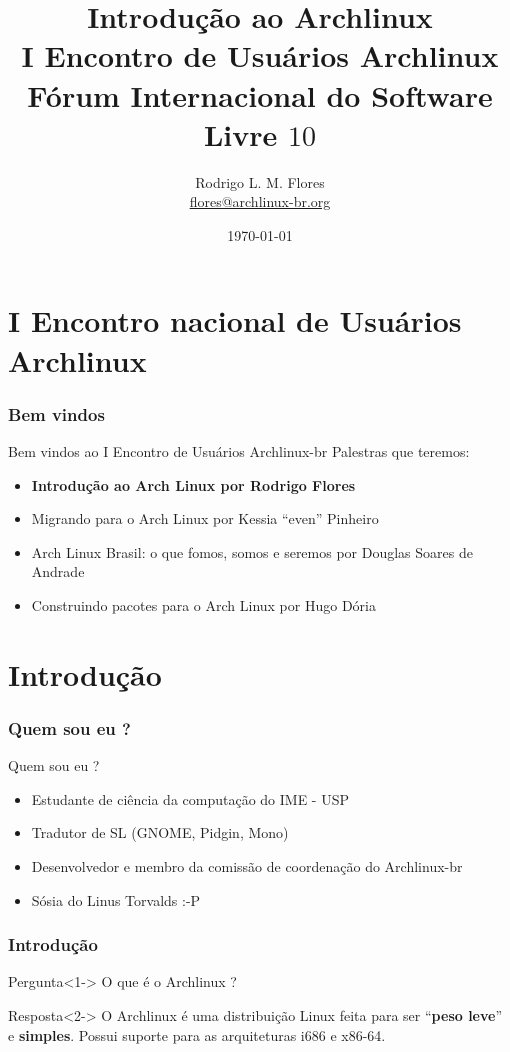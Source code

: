 \documentclass{beamer}
\title{Introdução ao Archlinux\\I Encontro de Usuários Archlinux\\Fórum Internacional do Software Livre $10$}
\author{Rodrigo L. M. Flores \\ \url{flores@archlinux-br.org}}
\institute{Projeto Archlinux-BR}
\begin{document}
\date{\today}

\frame{\titlepage}
\section{I Encontro nacional de Usuários Archlinux}


\begin{frame}
    \frametitle{Bem vindos}
    \begin{block}{Bem vindos ao I Encontro de Usuários Archlinux-br}
        Palestras que teremos:
        \begin{itemize}
                \item<1-> \textbf{Introdução ao Arch Linux por Rodrigo Flores}
            \item<2-> Migrando para o Arch Linux por Kessia ``even'' Pinheiro
            \item<3-> Arch Linux Brasil: o que fomos, somos e seremos por Douglas Soares de Andrade
            \item<4-> Construindo pacotes para o Arch Linux por Hugo Dória
        \end{itemize}
    \end{block}
\end{frame}

\section{Introdução}


\begin{frame}
    \frametitle{Quem sou eu ?}
    \begin{block}{Quem sou eu ?}
        \begin{itemize}
            \item<1-> Estudante de ciência da computação do IME - USP 
            \item<2-> Tradutor de SL (GNOME, Pidgin, Mono)
            \item<3-> Desenvolvedor e membro da comissão de coordenação do Archlinux-br
            \item<4-> Sósia do Linus Torvalds :-P 
        \end{itemize}
    \end{block}
\end{frame}



\begin{frame}
    \frametitle{Introdução}
    \begin{block}{Pergunta}<1->
        O que é o Archlinux ?
    \end{block}
    \begin{block}{Resposta}<2->
            O Archlinux é uma distribuição Linux feita para ser ``\textbf{peso leve}'' e \textbf{simples}. Possui suporte para as arquiteturas i686 e x86-64. 
    \end{block}
    
\end{frame}
\end{document}
